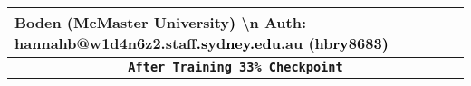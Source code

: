 \begin{table*}[t]
{\begin{tabular}{@{}p{16cm}@{}}
\textcolor[RGB]{255,180,150}{ B}\textcolor[RGB]{255,100,0}{oden} \textcolor[RGB]{255,100,0}{ (}\textcolor[RGB]{255,100,0}{Mc}\textcolor[RGB]{255,180,150}{Master} \textcolor[RGB]{0,0,205}{ University}\textcolor{black}{)} \textcolor[RGB]{255,100,0}{ \textbackslash n }\textcolor[RGB]{255,100,0}{Auth}\textcolor[RGB]{255,100,0}{:} \textcolor[RGB]{255,100,0}{ h}\textcolor[RGB]{255,100,0}{ann}\textcolor[RGB]{30,144,255}{ah}\textcolor[RGB]{0,0,205}{b}\textcolor[RGB]{255,180,150}{@}\textcolor[RGB]{255,100,0}{w}\textcolor[RGB]{0,0,205}{1}\textcolor[RGB]{255,100,0}{d}\textcolor[RGB]{255,180,150}{4}\textcolor[RGB]{30,144,255}{n}\textcolor{black}{6}\textcolor[RGB]{255,100,0}{z}\textcolor[RGB]{255,180,150}{2}\textcolor[RGB]{255,180,150}{.}\textcolor[RGB]{255,100,0}{st}\textcolor[RGB]{255,100,0}{aff}\textcolor{black}{.}\textcolor{black}{s}\textcolor[RGB]{255,100,0}{yd}\textcolor{black}{ney}\textcolor{black}{.}\textcolor{black}{edu}\textcolor[RGB]{30,144,255}{.}\textcolor[RGB]{30,144,255}{au} \textcolor[RGB]{255,100,0}{ (}\textcolor[RGB]{255,100,0}{h}\textcolor[RGB]{255,180,150}{b}\textcolor{black}{ry}\textcolor[RGB]{255,180,150}{8}\textcolor[RGB]{255,180,150}{6}\textcolor[RGB]{0,0,205}{8}\textcolor{black}{3}\textcolor{black}{)} \\
\midrule
\multicolumn{1}{c}{\textbf{\texttt{After Training 33\% Checkpoint}}} \\
\midrule

\end{tabular}}
\end{table*}
